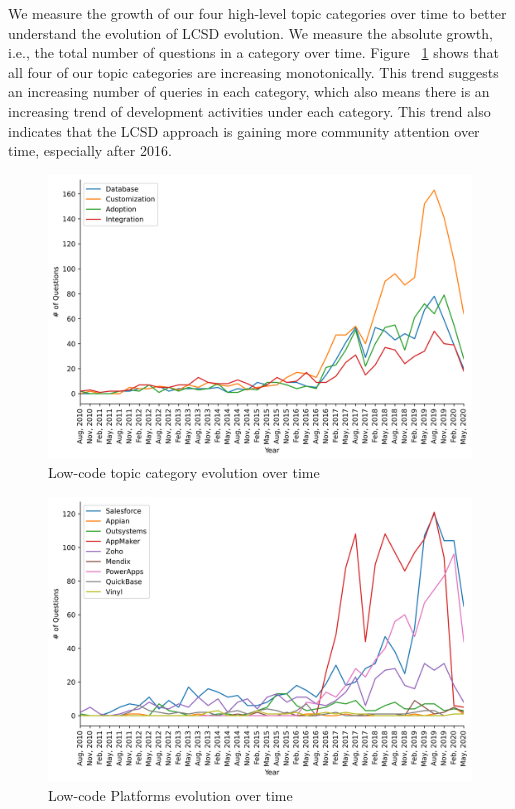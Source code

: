 We measure the growth of our four high-level topic categories over time to better understand the evolution of LCSD evolution. We measure the absolute growth, i.e., the total number of questions in a category over time. Figure ~\ref{fig:trend_questions_per_topic_category} shows that all four of our topic categories are increasing monotonically. This trend suggests an increasing number of queries in each category, which also means there is an increasing trend of development activities under each category. This trend also indicates that the LCSD approach is gaining more community attention over time, especially after 2016. 
\begin{figure}[t]
\centering
\includegraphics[scale=0.38]{res/Question_per_higher_category.png}
\caption{Low-code topic category evolution over time}
\label{fig:trend_questions_per_topic_category}
\end{figure}

\begin{figure}[t]
\centering
\includegraphics[scale=0.38]{res/question_per_platform.png}
\caption{Low-code Platforms evolution over time}
\label{fig:trend_questions_per_platform}
\end{figure}

